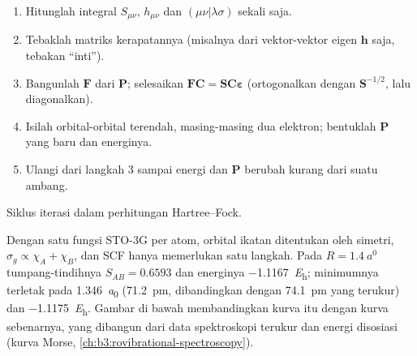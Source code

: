 \begin{method}\label{met:b3:computational-chemistry:scf}
\begin{enumerate}
  \item Hitunglah integral $S_{\mu\nu}$, $h_{\mu\nu}$ dan $(\mu\nu|\lambda\sigma)$ sekali saja.
  \item Tebaklah matriks kerapatannya (misalnya dari vektor-vektor eigen
        $\mathbf h$ saja, tebakan ``inti'').
  \item Bangunlah $\mathbf F$ dari $\mathbf P$; selesaikan $\mathbf F\mathbf C = \mathbf S\mathbf C
        \boldsymbol\varepsilon$ (ortogonalkan dengan $\mathbf S^{-1/2}$, lalu diagonalkan).
  \item Isilah orbital-orbital terendah, masing-masing dua elektron; bentuklah
        $\mathbf P$ yang baru dan energinya.
  \item Ulangi dari langkah 3 sampai energi dan $\mathbf P$ berubah kurang
        dari suatu ambang.
\end{enumerate}
\end{method}

\begin{omfigure}

{\small Siklus iterasi  dalam perhitungan Hartree--Fock.}
\end{omfigure}

\begin{example}\label{ex:b3:computational-chemistry:h2}
Dengan satu fungsi STO-3G per atom, orbital ikatan ditentukan oleh simetri,
$\sigma_g \propto \chi_A + \chi_B$, dan SCF hanya memerlukan satu langkah. Pada
$R =
\qty{1.4}{\bohr}$ tumpang-tindihnya $S_{AB} = 0.6593$ dan energinya
\qty{-1.1167}{\hartree}; minimumnya terletak pada \qty{1.346}{\bohr}
(\qty{71.2}{pm}, dibandingkan dengan \qty{74.1}{pm} yang terukur) dan
\qty{-1.1175}{\hartree}. Gambar di bawah membandingkan kurva itu dengan kurva
sebenarnya, yang dibangun dari data spektroskopi terukur dan energi disosiasi
(kurva Morse, \cref{ch:b3:rovibrational-spectroscopy}).
\end{example}

